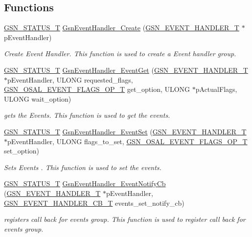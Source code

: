 \subsection*{Functions}
\begin{DoxyCompactItemize}
\item 
\hyperlink{a00659_gae36517c0f5872426a7034c9551eb96ac}{GSN\_\-STATUS\_\-T} \hyperlink{a00622_ga1444fb0959aa0a4116350050672123e8}{GsnEventHandler\_\-Create} (\hyperlink{a00069}{GSN\_\-EVENT\_\-HANDLER\_\-T} $\ast$pEventHandler)
\begin{DoxyCompactList}\small\item\em Create Event Handler. This function is used to create a Event handler group. \end{DoxyCompactList}\item 
\hyperlink{a00659_gae36517c0f5872426a7034c9551eb96ac}{GSN\_\-STATUS\_\-T} \hyperlink{a00622_gad6d98740195b5df6efecc955027ca980}{GsnEventHandler\_\-EventGet} (\hyperlink{a00069}{GSN\_\-EVENT\_\-HANDLER\_\-T} $\ast$pEventHandler, ULONG requested\_\-flags, \hyperlink{a00536_a3782687de549490574b44f3374fb5731}{GSN\_\-OSAL\_\-EVENT\_\-FLAGS\_\-OP\_\-T} get\_\-option, ULONG $\ast$pActualFlags, ULONG wait\_\-option)
\begin{DoxyCompactList}\small\item\em gets the Events. This function is used to get the events. \end{DoxyCompactList}\item 
\hyperlink{a00659_gae36517c0f5872426a7034c9551eb96ac}{GSN\_\-STATUS\_\-T} \hyperlink{a00622_ga4303e460164a4a63050c356c1d9e7371}{GsnEventHandler\_\-EventSet} (\hyperlink{a00069}{GSN\_\-EVENT\_\-HANDLER\_\-T} $\ast$pEventHandler, ULONG flags\_\-to\_\-set, \hyperlink{a00536_a3782687de549490574b44f3374fb5731}{GSN\_\-OSAL\_\-EVENT\_\-FLAGS\_\-OP\_\-T} set\_\-option)
\begin{DoxyCompactList}\small\item\em Sets Events . This function is used to set the events. \end{DoxyCompactList}\item 
\hyperlink{a00659_gae36517c0f5872426a7034c9551eb96ac}{GSN\_\-STATUS\_\-T} \hyperlink{a00622_ga838bf8879aab1d57f5ef7981f9a5e3d0}{GsnEventHandler\_\-EventNotifyCb} (\hyperlink{a00069}{GSN\_\-EVENT\_\-HANDLER\_\-T} $\ast$pEventHandler, \hyperlink{a00622_ga570a795e4730bcaa1c17b58223336526}{GSN\_\-EVENT\_\-HANDLER\_\-CB\_\-T} events\_\-set\_\-notify\_\-cb)
\begin{DoxyCompactList}\small\item\em registers call back for events group. This function is used to register call back for events group. \end{DoxyCompactList}\item 

\end{DoxyCompactItemize}
